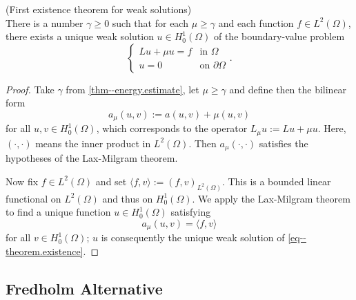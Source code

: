 \documentclass[11pt]{article}
\begin{document}
			\begin{thm}
				(First existence theorem for weak solutions)\\ There is a number $\gamma\ge0$ such that for each $\mu\ge\gamma$ and each function $f\in L^2(\Omega)$, there exists a unique weak solution $u\in H^1_0(\Omega)$ of the boundary-value problem
				\begin{equation}\label{eq--theorem.existence}
					\begin{cases}
						Lu+\mu u=f & \text{in }\Omega\\
						u=0 & \text{on }\partial\Omega
					\end{cases}.
				\end{equation}
			\end{thm}
			\begin{proof}
				Take $\gamma$ from \autoref{thm--energy.estimate}, let $\mu\ge\gamma$ and define then the bilinear form
				\begin{equation}\label{def a_mu}
					a_\mu(u,v):=a(u,v)+\mu(u,v)
				\end{equation}
				for all $u,v\in H^1_0(\Omega)$, which corresponds to the operator $L_\mu u:=Lu+\mu u$. Here, $(\cdot,\cdot)$ means the inner product in $L^2(\Omega)$. Then $a_\mu(\cdot,\cdot)$ satisfies the hypotheses of the Lax-Milgram theorem.

				Now fix $f\in L^2(\Omega)$ and set $\langle f,v\rangle:=(f,v)_{L^2(\Omega)}$. This is a bounded linear functional on $L^2(\Omega)$ and thus on $H^1_0(\Omega)$. We apply the Lax-Milgram theorem to find a unique function $u\in H^1_0(\Omega)$ satisfying
				\begin{equation*}
					a_\mu(u,v)=\langle f,v\rangle
				\end{equation*}
				for all $v\in H^1_0(\Omega)$; $u$ is consequently the unique weak solution of \eqref{eq--theorem.existence}.
			\end{proof}
			
			
		\subsection{Fredholm Alternative}
			
\end{document}
